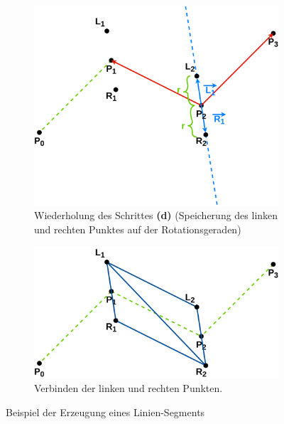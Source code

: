 \documentclass[doktyp=studarbeit]{TUBAFarbeiten}
\begin{document}
\begin{figure}[!htb]
\begin{subfigure}[b]{0.35\textwidth}
    \end{subfigure}
    \qquad
    \begin{subfigure}[b]{0.35\textwidth}
        \centering
        \includegraphics[width=1\linewidth]{Schlangenlinie-7.png}
        \caption{Wiederholung des Schrittes \textbf{(d)} 
        (Speicherung des linken und rechten Punktes auf der Rotationsgeraden)}
    \end{subfigure}
    \qquad
    \begin{subfigure}[b]{0.35\textwidth}
        \centering
        \includegraphics[width=1\linewidth]{Schlangenlinie-8.png}
        \caption{Verbinden der linken und rechten Punkten.}
    \end{subfigure}
    \caption{Beispiel der Erzeugung eines Linien-Segments}
	\label{fig:line}
\end{figure}
\end{document}
